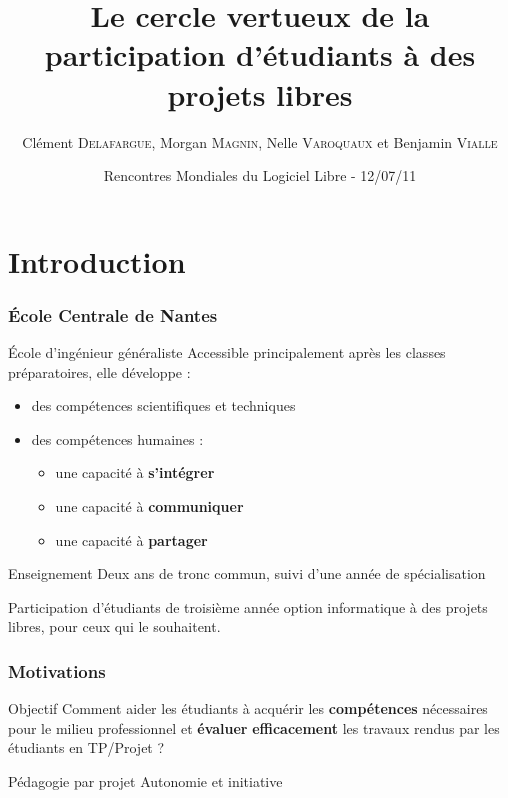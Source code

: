 \documentclass[hyperref,french,usenames,xcolor=dvipsnames]{beamer}
\title[OOo Edu]%
{Le cercle vertueux de la participation d'étudiants à des projets libres}
\author[C. \textsc{Delafargue}, M. \textsc{Magnin}, N. \textsc{Varoquaux}, B. \textsc{Vialle}]%
{Clément \textsc{Delafargue}, Morgan \textsc{Magnin}, Nelle \textsc{Varoquaux} et Benjamin \textsc{Vialle}
}
\institute[ECN]{
\structure{
École Centrale de Nantes}
}
\date[12/07/2011]{Rencontres Mondiales du Logiciel Libre - 12/07/11}
\begin{document}
\frame{\titlepage}


\section{Introduction}

\frame
{
  \frametitle{École Centrale de Nantes}

  \begin{block}{École d'ingénieur généraliste}
  Accessible principalement après les classes préparatoires, elle développe :
    \begin{itemize}
      \item des compétences scientifiques et techniques
      \item des compétences humaines :
      \begin{itemize}
                \item une capacité à {\bf s'intégrer}
                \item une capacité à {\bf communiquer}
                \item une capacité à {\bf partager}
      \end{itemize}
    \end{itemize}
  \end{block}
  
  \begin{block}{Enseignement}
        Deux ans de tronc commun, suivi d'une année de spécialisation
  \end{block}
  
  \begin{alertblock}{}
    Participation d'étudiants de troisième année option informatique à des projets libres, pour ceux qui le souhaitent.
  \end{alertblock}
}

\frame
{
  \frametitle{Motivations}

\begin{alertblock}{Objectif}
Comment aider les étudiants à acquérir les \textbf{compétences} nécessaires pour le milieu professionnel et \textbf{évaluer} \textbf{efficacement} les travaux rendus par les étudiants en TP/Projet ?
\end{alertblock}

\begin{block}{Pédagogie par projet}
Autonomie et initiative
\end{block}

}
\end{document}
